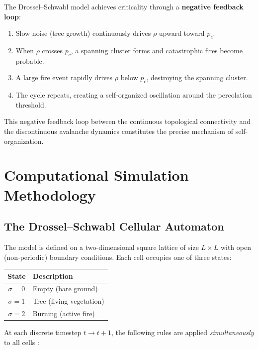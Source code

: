 \documentclass[12pt, a4paper]{article}
\begin{document}
The Drossel--Schwabl model achieves criticality through a \textbf{negative feedback loop}:
\begin{enumerate}
    \item Slow noise (tree growth) continuously drives $\rho$ upward toward $p_c$.
    \item When $\rho$ crosses $p_c$, a spanning cluster forms and catastrophic fires become probable.
    \item A large fire event rapidly drives $\rho$ below $p_c$, destroying the spanning cluster.
    \item The cycle repeats, creating a self-organized oscillation around the percolation threshold.
\end{enumerate}

This negative feedback loop between the continuous topological connectivity and the discontinuous avalanche dynamics constitutes the precise mechanism of self-organization.


\section{Computational Simulation Methodology}
\label{sec:methods}

\subsection{The Drossel--Schwabl Cellular Automaton}

The model is defined on a two-dimensional square lattice of size $L \times L$ with open (non-periodic) boundary conditions. Each cell occupies one of three states:

\begin{center}
\begin{tabular}{cl}
    \toprule
    \textbf{State} & \textbf{Description} \\
    \midrule
    $\sigma = 0$ & Empty (bare ground) \\
    $\sigma = 1$ & Tree (living vegetation) \\
    $\sigma = 2$ & Burning (active fire) \\
    \bottomrule
\end{tabular}
\end{center}

At each discrete timestep $t \to t+1$, the following rules are applied \emph{simultaneously} to all cells \citep{drossel1992}:
\end{document}
